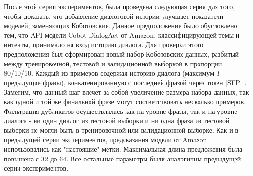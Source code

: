 После этой серии экспериментов, была проведена следующая серия для того, чтобы доказать, что добавление диалоговой истории улучшает показатели моделей, заменяющих Коботовские. Данное предположение было обусловлено тем, что API модели Cobot DialogAct от Amazon, классифицирующей темы и интенты, принимало на вход историю диалога. 
Для проверки этого предположения был сформирован новый набор Коботовских данных, разбитый между тренировочной, тестовой и валидационной выборкой в пропорции 80/10/10. Каждый из примеров содержал историю диалога (максимум 3 предыдущие фразы), конкатенированную с последней фразой через токен [SEP] . Заметим, что данный шаг влечет за собой увеличение размера набора данных, так как одной и той же финальной фразе могут соответствовать несколько примеров. Фильтрация дубликатов осуществлялась как на уровне фразы, так и на уровне диалога - ни один диалог из тестовой выборки и ни одна фраза из тестовой выборки не могли быть в тренировочной или валидационной выборке. Как и в предыдущей серии экспериментов, предсказания модели от Amazon использовались как "настоящие" метки. Максимальная длина предложения была повышена с 32 до 64. Все остальные параметры были аналогичны предыдущей серии экспериментов.


\begin{table}[htbp]
\centering
\caption {Точность (f1) с диалоговой историей для многозадачной модели с 1 линейным слоем, только Коботовские задачи}
\label{mtldream:2}
\end{table}


